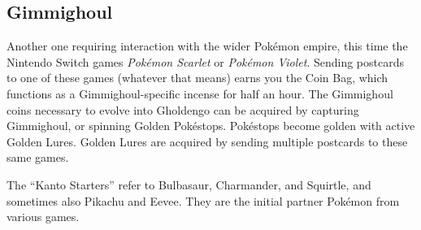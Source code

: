 \subsection{Gimmighoul}
\label{sec:gimmighoul}
Another one requiring interaction with the wider Pokémon empire, this time
 the Nintendo Switch games \textit{Pokémon Scarlet} or \textit{Pokémon Violet}.
Sending postcards to one of these games (whatever that means) earns you the Coin Bag,
 which functions as a Gimmighoul-specific incense for half an hour.
The Gimmighoul coins necessary to evolve into Gholdengo can be acquired by capturing
 Gimmighoul, or spinning Golden Pokéstops.
Pokéstops become golden with active Golden Lures.
Golden Lures are acquired by sending multiple postcards to these same games.

\begin{tipbox}[title=Kanto Starters]
The ``Kanto Starters'' refer to Bulbasaur, Charmander, and Squirtle, and sometimes
  also Pikachu and Eevee.
They are the initial partner Pokémon from various games.
\end{tipbox}
